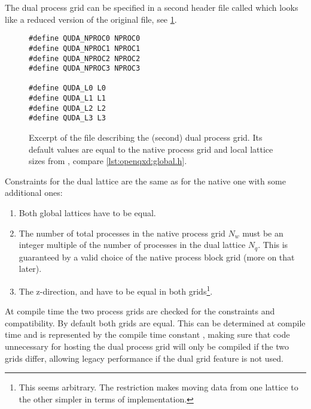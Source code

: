 The dual process grid can be specified in a second header file called  which looks like a reduced version of the original  file, see \cref{lst:interface:quda_global.h}.
\begin{figure}
\begin{codelisting}
\begin{verbatim}
#define QUDA_NPROC0 NPROC0
#define QUDA_NPROC1 NPROC1
#define QUDA_NPROC2 NPROC2
#define QUDA_NPROC3 NPROC3

#define QUDA_L0 L0
#define QUDA_L1 L1
#define QUDA_L2 L2
#define QUDA_L3 L3
\end{verbatim}
\caption{Excerpt of the file  describing the (second) dual process grid. Its default values are equal to the native process grid and local lattice sizes from , compare \cref{lst:openqxd:global.h}.}
\label{lst:interface:quda_global.h}
\end{codelisting}
\end{figure}

Constraints for the dual lattice are the same as for the native one with some additional ones:
\begin{enumerate}
  \item Both global lattices have to be equal.
  \item The number of total processes in the native process grid $N_w$ must be an integer multiple of the number of processes in the dual lattice $N_q$. This is guaranteed by a valid choice of the native process block grid (more on that later).
  \item The z-direction,  and  have to be equal in both grids\footnote{This seems arbitrary. The restriction makes moving data from one lattice to the other simpler in terms of implementation.}.
\end{enumerate}
At compile time the two process grids are checked for the constraints and compatibility. By default both grids are equal. This can be determined at compile time and is represented by the compile time constant , making sure that code unnecessary for hosting the dual process grid will only be compiled if the two grids differ, allowing legacy performance if the dual grid feature is not used.

